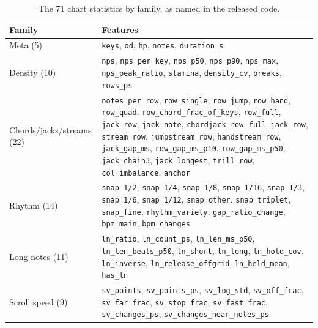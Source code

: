 \begin{table}[H]
\centering\footnotesize
\caption{The 71 chart statistics by family, as named in the released code.}
\label{tab:features}
\begin{tabular}{lp{}}
\toprule
Family & Features \\
\midrule
Meta (5) & \texttt{keys}, \texttt{od}, \texttt{hp}, \texttt{notes}, \texttt{duration\_s} \\
Density (10) & \texttt{nps}, \texttt{nps\_per\_key}, \texttt{nps\_p50}, \texttt{nps\_p90}, \texttt{nps\_max}, \texttt{nps\_peak\_ratio}, \texttt{stamina}, \texttt{density\_cv}, \texttt{breaks}, \texttt{rows\_ps} \\
Chords/jacks/streams (22) & \texttt{notes\_per\_row}, \texttt{row\_single}, \texttt{row\_jump}, \texttt{row\_hand}, \texttt{row\_quad}, \texttt{row\_chord\_frac\_of\_keys}, \texttt{row\_full}, \texttt{jack\_row}, \texttt{jack\_note}, \texttt{chordjack\_row}, \texttt{full\_jack\_row}, \texttt{stream\_row}, \texttt{jumpstream\_row}, \texttt{handstream\_row}, \texttt{jack\_gap\_ms}, \texttt{row\_gap\_ms\_p10}, \texttt{row\_gap\_ms\_p50}, \texttt{jack\_chain3}, \texttt{jack\_longest}, \texttt{trill\_row}, \texttt{col\_imbalance}, \texttt{anchor} \\
Rhythm (14) & \texttt{snap\_1/2}, \texttt{snap\_1/4}, \texttt{snap\_1/8}, \texttt{snap\_1/16}, \texttt{snap\_1/3}, \texttt{snap\_1/6}, \texttt{snap\_1/12}, \texttt{snap\_other}, \texttt{snap\_triplet}, \texttt{snap\_fine}, \texttt{rhythm\_variety}, \texttt{gap\_ratio\_change}, \texttt{bpm\_main}, \texttt{bpm\_changes} \\
Long notes (11) & \texttt{ln\_ratio}, \texttt{ln\_count\_ps}, \texttt{ln\_len\_ms\_p50}, \texttt{ln\_len\_beats\_p50}, \texttt{ln\_short}, \texttt{ln\_long}, \texttt{ln\_hold\_cov}, \texttt{ln\_inverse}, \texttt{ln\_release\_offgrid}, \texttt{ln\_held\_mean}, \texttt{has\_ln} \\
Scroll speed (9) & \texttt{sv\_points}, \texttt{sv\_points\_ps}, \texttt{sv\_log\_std}, \texttt{sv\_off\_frac}, \texttt{sv\_far\_frac}, \texttt{sv\_stop\_frac}, \texttt{sv\_fast\_frac}, \texttt{sv\_changes\_ps}, \texttt{sv\_changes\_near\_notes\_ps} \\
\bottomrule
\end{tabular}
\end{table}
